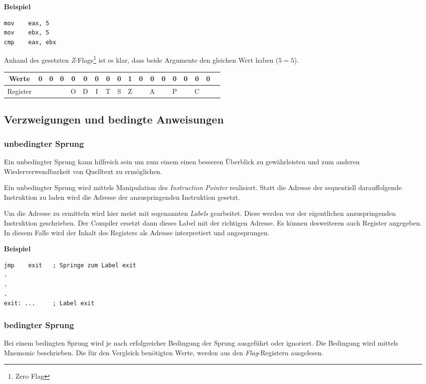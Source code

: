 \textbf{Beispiel}

\begin{lstlisting}
mov    eax, 5
mov    ebx, 5
cmp    eax, ebx
\end{lstlisting}

Anhand des gesetzten \textit{Z}-Flags\footnote{Zero Flag} ist es klar, dass beide Argumente den gleichen Wert haben ($5 = 5$). 

\begin{tabular}{|c|c|c|c|c|c|c|c|c|c|c|c|c|c|c|c|c|c|}
\hline Werte & 0 & 0 & 0 & 0 & 0 & 0 & 0 & 0 & 1 & 0 & 0 & 0 & 0 & 0 & 0 & 0 \\
\hline Register & & & & O & D & I & T & S & Z & & A & & P & & C \\
\hline
\end{tabular}

\subsection{Verzweigungen und bedingte Anweisungen}

\subsubsection{unbedingter Sprung}
Ein unbedingter Sprung kann hilfreich sein um zum einem einen besseren Überblick zu gewährleisten und zum anderen Wiederverwendbarkeit von Quelltext zu ermöglichen.

Ein unbedingter Sprung wird mittels Manipulation des \textit{Instruction Pointer} realisiert.
Statt die Adresse der sequentiell darauffolgende Instruktion zu laden wird die Adresse der anzuspringenden Instruktion gesetzt.

Um die Adresse zu ermitteln wird hier meist mit sogenannten \textit{Labels} gearbeitet. Diese werden vor der eigentlichen anzuspringenden Instruktion geschrieben. Der Compiler ersetzt dann dieses Label mit der richtigen Adresse. Es können desweiteren auch Register angegeben. In diesem Falle wird der Inhalt des Registers als Adresse interpretiert und angesprungen.

\textbf{Beispiel}

\begin{lstlisting}
jmp    exit   ; Springe zum Label exit
.
.
.
exit: ...     ; Label exit
\end{lstlisting}

\subsubsection{bedingter Sprung}
Bei einem bedingten Sprung wird je nach erfolgreicher Bedingung der Sprung ausgeführt oder ignoriert. Die Bedingung wird mittels Mnemonic beschrieben. Die für den Vergleich benötigten Werte, werden aus den \textit{Flag}-Registern ausgelesen.

